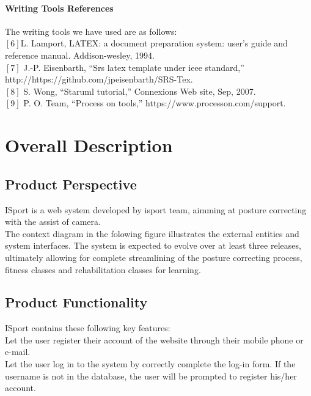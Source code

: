 \documentclass[16pt]{scrreprt}
\begin{document}
\subsubsection{Writing Tools References}
The writing tools we have used are as follows:\\

$[6]$L. Lamport, LATEX: a document preparation system: user’s guide and reference manual. Addison-wesley, 1994.\\

$[7]$ J.-P. Eisenbarth, “Srs latex template under ieee standard,” \\http://https://github.com/jpeisenbarth/SRS-Tex.\\

$[8]$ S. Wong, “Staruml tutorial,” Connexions Web site, Sep, 2007.\\

$[9]$ P. O. Team, “Process on tools,” https://www.processon.com/support.

\chapter{Overall Description}
\label{Overall Description}

 
\section{Product Perspective}

 
ISport is a web system developed by isport team, aimming at posture correcting with the assist of camera.\\

 
The context diagram in the folowing figure illustrates the external entities and system interfaces. The system is expected to evolve over at least three releases, ultimately allowing for complete streamlining of the posture correcting process, fitness classes and rehabilitation classes for learning.

 
\section{Product Functionality}

 

ISport contains these following key features:\\
Let the user register their account of the website through their mobile phone or e-mail.\\

 
Let the user log in to the system by correctly complete the log-in form. If the username is not in the database, the user will be prompted to register his/her account.\\
\end{document}
